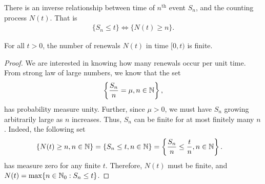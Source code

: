\documentclass[a4paper,10pt, english]{article}
\begin{document}
\begin{lem}
	There is an inverse relationship between time of $n^{\text{th}}$ event $S_n$, and the counting process $N(t)$. That is
	\begin{align}
	\label{eq:InverseRelationship}
	\{S_n \leq t\} \iff \{N(t) \geq n\}.
	\end{align}
\end{lem}

\begin{lem}[Finiteness of $N(t)$]
For all $t > 0$, the number of renewals $N(t)$ in time $[0,t)$ is finite. 
\end{lem}
\begin{proof}
We are interested in knowing how many renewals occur per unit time. 
From strong law of large numbers, we know that the set
\begin{align*} 
\left\{\frac{S_n}{n} = \mu, n \in \mathbb{N}\right\},
\end{align*}
has probability measure unity. 
Further, since $\mu > 0$, we must have $S_n$ growing arbitrarily large as $n$ increases. 
Thus, $S_n$ can be finite for at most finitely many $n$. 
Indeed, the following set 
\begin{align*}
\{N(t) \geq n, n \in \N\} &= \{S_n \leq t, n \in \N\} = \left\{\frac{S_n}{n} \leq \frac{t}{n}, n \in \N \right\}.%
\end{align*}
has measure zero for any finite $t$.  
Therefore, $N(t)$ must be finite, and
$N(t) = \max\{n \in \mathbb{N}_0 : S_n \leq t\}$.
\end{proof}
\end{document}

